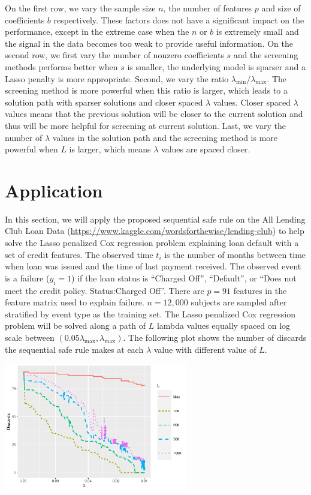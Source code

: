 On the first row, we vary the sample size $n$, the number of features $p$ and size of coefficients $b$ respectively. These factors does not have a significant impact on the performance, except in the extreme case when the $n$ or $b$ is extremely small and the signal in the data becomes too weak to provide useful information. On the second row, we first vary the number of nonzero coefficients $s$ and the screening methods performs better when $s$ is smaller, the underlying model is sparser and a Lasso penalty is more appropriate. Second, we vary the ratio $\lambda_{\min}/\lambda_{\max}$. The screening method is more powerful when this ratio is larger, which leads to a solution path with sparser solutions and closer spaced $\lambda$ values. Closer spaced $\lambda$ values means that the previous solution will be closer to the current solution and thus will be more helpful for screening at current solution. Last, we vary the number of $\lambda$ values in the solution path and the screening method is more powerful when $L$ is larger, which means $\lambda$ values are spaced closer.  

\section{Application}

In this section, we will apply the proposed sequential safe rule on the All Lending Club Loan Data (\url{https://www.kaggle.com/wordsforthewise/lending-club}) to help solve the Lasso penalized Cox regression problem explaining loan default with a set of credit features. The observed time $t_i$ is the number of months between time when loan was issued and the time of last payment received. The observed event is a failure ($y_i=1$) if the loan status is ``Charged Off'', ``Default'', or ``Does not meet the credit policy. Status:Charged Off''. There are $p=91$ features in the feature matrix used to explain failure. $n=12,000$ subjects are sampled after stratified by event type as the training set. The Lasso penalized Cox regression problem will be solved along a path of $L$ lambda values equally spaced on log scale between $(0.05\lambda_{\max},\lambda_{\max})$. The following plot shows the number of discards the sequential safe rule makes at each $\lambda$ value with different value of $L$.

\begin{center}
    \includegraphics[width=0.6\textwidth]{app.pdf}
\end{center}

